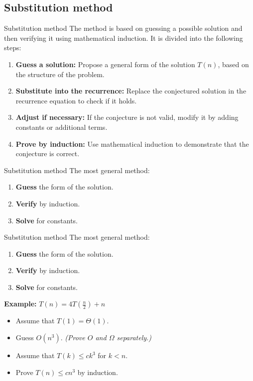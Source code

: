 \documentclass{beamer}
\begin{document}
\subsection{Substitution method}

\begin{frame}{Substitution method}
    The method is based on guessing a possible solution and then verifying it using mathematical induction. It is divided into the following steps:
    \begin{enumerate}
        \item \textbf{Guess a solution:} Propose a general form of the solution $T(n)$, based on the structure of the problem.
        \item \textbf{Substitute into the recurrence:} Replace the conjectured solution in the recurrence equation to check if it holds.
        \item \textbf{Adjust if necessary:} If the conjecture is not valid, modify it by adding constants or additional terms.
        \item \textbf{Prove by induction:} Use mathematical induction to demonstrate that the conjecture is correct.
    \end{enumerate}
\end{frame}

\begin{frame}{Substitution method}
    The most general method:
    \begin{enumerate}
        \item \textbf{Guess} the form of the solution.
        \item \textbf{Verify} by induction.
        \item \textbf{Solve} for constants.
    \end{enumerate}
\end{frame}

\begin{frame}{Substitution method}
    The most general method:
    \begin{enumerate}
        \item \textbf{Guess} the form of the solution.
        \item \textbf{Verify} by induction.
        \item \textbf{Solve} for constants.
    \end{enumerate}
    \begin{exampleblock}{\textbf{Example:}}
        \vspace{2mm}
        $ T(n) = 4T(\frac{n}{2}) + n$
        \begin{itemize}
            \item Assume that $T(1) = \Theta(1)$.
            \item Guess $O(n^3)$. \textit{(Prove $O$ and $\Omega$ separately.)}
            \item Assume that $T(k) \leq ck^3$ for $k < n$.
            \item Prove $T(n) \leq cn^3$ by induction.
        \end{itemize}
    \end{exampleblock}
\end{frame}
\end{document}
